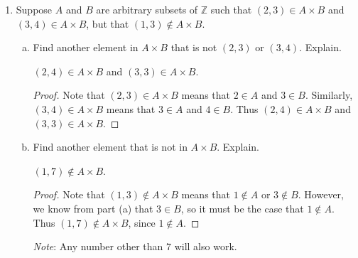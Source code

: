 \documentclass[11pt]{article}
\newcommand{\ZZ}{\mathbb{Z}}
\begin{document}
\begin{enumerate}
\begin{Solution}
\begin{proof}
 \end{proof}


\end{Solution}


 \item Suppose $A$ and $B$ are arbitrary subsets of $\ZZ$ such that $(2,3)\in A\times B$ and $(3,4)\in A\times B$, but that $(1,3)\not\in A\times B$. 
     \begin{enumerate}[(a)]
             \item Find another element in $A\times B$ that is not $(2,3)$ or $(3,4)$. Explain.
             \begin{Solution}$(2,4)\in A\times B$ and $(3,3)\in A\times B$.
             \begin{proof}
             Note that $(2,3)\in A\times B$ means that $2\in A$ and $3\in B$. Similarly, $(3,4)\in A\times B$ means that $3\in A$ and $4\in B$. Thus $(2,4)\in A\times B$ and $(3,3)\in A\times B$.
              \end{proof}
\end{Solution}
             \item Find another element that is not in $A\times B$. Explain.
             \begin{Solution}$(1,7)\not\in A\times B$.
             \begin{proof}
             Note that $(1,3)\not\in A\times B$ means that $1\notin A$ or $3\notin B$. However, we know from part (a) that $3\in B$, so it must be the case that $1\notin A$. Thus $(1,7)\notin A\times B$, since $1\notin A$. 
              \end{proof}
              \emph{Note}: Any number other than $7$ will also work.
              \end{Solution}
     \end{enumerate}
     


\end{enumerate}
\end{document}
